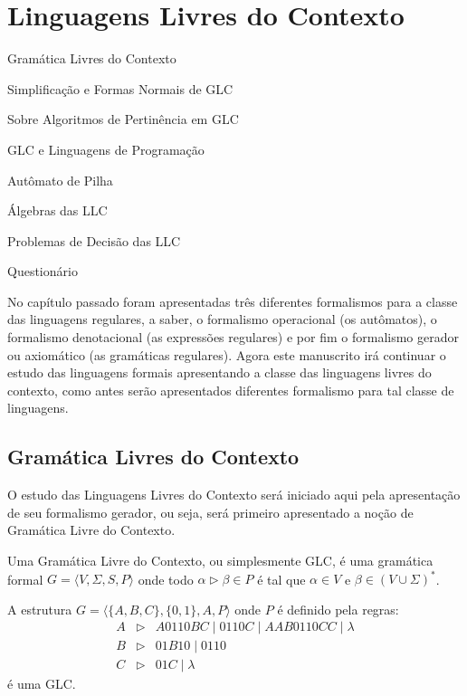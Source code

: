 
\chapter{Linguagens Livres do Contexto}\label{cap:LinguagemLLC}

\begin{introduction}[Tópicos]
	\item Gramática Livres do Contexto
	\item Simplificação e Formas Normais de GLC
	\item Sobre Algoritmos de Pertinência em GLC
	\item GLC e Linguagens de Programação
	\item Autômato de Pilha
	\item Álgebras das LLC
	\item Problemas de Decisão das LLC
	\item Questionário
\end{introduction}

No capítulo passado foram apresentadas três diferentes formalismos para a classe das linguagens regulares, a saber, o formalismo operacional (os autômatos), o formalismo denotacional (as expressões regulares) e por fim o formalismo gerador ou axiomático (as gramáticas regulares). Agora este manuscrito irá continuar o estudo das linguagens formais apresentando a classe das linguagens livres do contexto, como antes serão apresentados diferentes formalismo para tal classe de linguagens.

\section{Gramática Livres do Contexto}\label{sec:GLC}

O estudo das Linguagens Livres do Contexto será iniciado aqui pela apresentação de seu formalismo gerador, ou seja, será primeiro apresentado a noção de Gramática Livre do Contexto.

\begin{definition}\label{def:GLC}
	\cite{benjaLivro2010} Uma Gramática Livre do Contexto, ou simplesmente GLC, é uma gramática formal $G = \langle V, \Sigma, S, P\rangle$ onde todo $\alpha \rhd \beta \in P$ é tal que $\alpha \in V$ e $\beta \in (V \cup \Sigma)^*$.
\end{definition}

\begin{example}\label{exe:GLC-1}
	A estrutura $G = \langle \{A, B, C\}, \{0,1\}, A, P\rangle$ onde $P$ é definido pela regras:
	\begin{eqnarray*}
		A & \rhd & A0110BC \mid 0110C \mid AAB0110CC \mid \lambda\\
		B & \rhd & 01B10 \mid 0110\\
		C & \rhd & 01C \mid \lambda
	\end{eqnarray*}
	é uma GLC.
\end{example}

